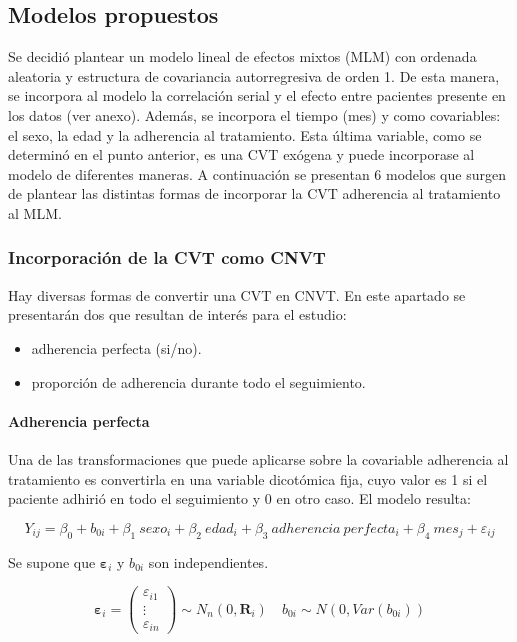 \documentclass[spanish]{article}
\numberwithin{figure}{subsection}
\numberwithin{equation}{subsection}
\numberwithin{table}{subsection}
\begin{document}
\subsection{Modelos propuestos}

Se decidió plantear un modelo lineal de efectos mixtos (MLM) con ordenada
aleatoria y estructura de covariancia autorregresiva de orden 1. De esta manera,
se incorpora al modelo la correlación serial y el efecto entre pacientes
presente en los datos (ver anexo). Además, se incorpora el tiempo (mes) y como
covariables: el sexo, la edad y la adherencia al tratamiento. Esta última
variable, como se determinó en el punto anterior, es una CVT exógena y puede
incorporase al modelo de diferentes maneras. A continuación se presentan 6
modelos que surgen de plantear las distintas formas de incorporar la CVT
adherencia al tratamiento al MLM.

\subsubsection{Incorporación de la CVT como CNVT}

Hay diversas formas de convertir una CVT en CNVT. En este apartado se
presentarán dos que resultan de interés para el estudio:

\begin{itemize}
	\item adherencia perfecta (si/no).
	\item proporción de adherencia durante todo el seguimiento.
\end{itemize}

\paragraph{Adherencia perfecta} \mbox{}

Una de las transformaciones que puede aplicarse sobre la covariable adherencia
al tratamiento es convertirla en una variable dicotómica fija, cuyo valor es 1
si el paciente adhirió en todo el seguimiento y 0 en otro caso. El modelo
resulta:

\begin{equation}
	\label{modelo_1}
	Y_{ij} = \beta_0 + b_{0i} + \beta_1\ sexo_i + \beta_2\ edad_i + \beta_3\ adherencia\ perfecta_i
	+ \beta_4\ mes_j + \varepsilon_{ij}
\end{equation}

Se supone que $\bm{\varepsilon}_i$ y $b_{0i}$ son independientes.

\[ 
	\bm{\varepsilon}_i = \begin{pmatrix} \varepsilon_{i1} \\ \vdots \\ \varepsilon_{in} \end{pmatrix} \sim N_{n}(0, \bm{R}_i)
	\quad
	b_{0i} \sim N(0, Var(b_{0i}))
\]
\end{document}
